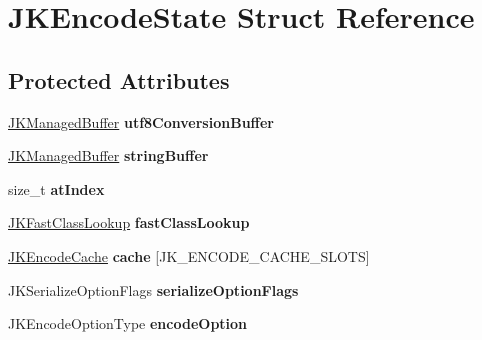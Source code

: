 \hypertarget{struct_j_k_encode_state}{\section{J\+K\+Encode\+State Struct Reference}
\label{struct_j_k_encode_state}
}
\subsection*{Protected Attributes}
\begin{DoxyCompactItemize}
\item 
\hypertarget{struct_j_k_encode_state_a1b0aea46e1e8d3c3c1a10c717b62e594}{\hyperlink{struct_j_k_managed_buffer}{J\+K\+Managed\+Buffer} {\bfseries utf8\+Conversion\+Buffer}}\label{struct_j_k_encode_state_a1b0aea46e1e8d3c3c1a10c717b62e594}

\item 
\hypertarget{struct_j_k_encode_state_a75a3a02fa81cbff32df3dd039bb1516e}{\hyperlink{struct_j_k_managed_buffer}{J\+K\+Managed\+Buffer} {\bfseries string\+Buffer}}\label{struct_j_k_encode_state_a75a3a02fa81cbff32df3dd039bb1516e}

\item 
\hypertarget{struct_j_k_encode_state_a74e949afd40d30d6bf3f90283fce0ffb}{size\+\_\+t {\bfseries at\+Index}}\label{struct_j_k_encode_state_a74e949afd40d30d6bf3f90283fce0ffb}

\item 
\hypertarget{struct_j_k_encode_state_afa5f38579b9be63a088d6e7633280998}{\hyperlink{struct_j_k_fast_class_lookup}{J\+K\+Fast\+Class\+Lookup} {\bfseries fast\+Class\+Lookup}}\label{struct_j_k_encode_state_afa5f38579b9be63a088d6e7633280998}

\item 
\hypertarget{struct_j_k_encode_state_a0ef51a24eff707dcbf33ae7247214d21}{\hyperlink{struct_j_k_encode_cache}{J\+K\+Encode\+Cache} {\bfseries cache} \mbox{[}J\+K\+\_\+\+E\+N\+C\+O\+D\+E\+\_\+\+C\+A\+C\+H\+E\+\_\+\+S\+L\+O\+T\+S\mbox{]}}\label{struct_j_k_encode_state_a0ef51a24eff707dcbf33ae7247214d21}

\item 
\hypertarget{struct_j_k_encode_state_ac12503e3307839b27c7d91e1fcb503c8}{J\+K\+Serialize\+Option\+Flags {\bfseries serialize\+Option\+Flags}}\label{struct_j_k_encode_state_ac12503e3307839b27c7d91e1fcb503c8}

\item 
\hypertarget{struct_j_k_encode_state_a8f92a733bcd0a24441b86fdf44746a2b}{J\+K\+Encode\+Option\+Type {\bfseries encode\+Option}}\label{struct_j_k_encode_state_a8f92a733bcd0a24441b86fdf44746a2b}


\end{DoxyCompactItemize}
